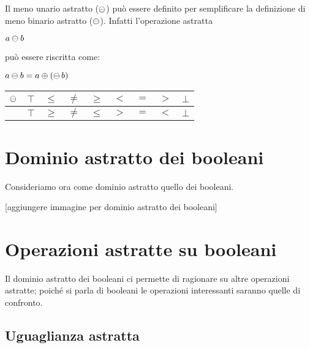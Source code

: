 Il meno unario astratto ($\mathop{\ominus}\nolimits$) può essere definito per semplificare la definizione di meno binario astratto ($\mathbin{\ominus}$). Infatti l'operazione astratta
\begin{center}
	$ a \mathbin{\ominus} b $
\end{center}
può essere riscritta come:

\begin{center}
	$ a  \mathbin{\ominus} b = a \mathbin{\oplus} (\mathop{\ominus}\nolimits b) $
\end{center}

\begin{center}
	\begin{tabular}{| c | c | c | c | c | c | c | c | c | }
		\hline
		$\mathop{\ominus}\nolimits$ & $\top$ & $\leq$ & $\neq$ & $\geq$ & $<$ & $=$ & $>$ & $\bot$ \\
		\hline
		  & $\top$ & $\geq$ & $\neq$ & $\leq$ & $>$ & $=$ & $<$ & $\bot$\\
		\hline
	\end{tabular}
\end{center}

\section{Dominio astratto dei booleani}


\newcommand*{\AbBool}{\mathrm{AbBool}}

\newcommand*{\signone}{\mathord{1}}
\newcommand*{\signzero}{\mathord{0}}

Consideriamo ora come dominio astratto quello dei booleani.

[aggiungere immagine per dominio astratto dei booleani]

\section{Operazioni astratte su booleani}

Il dominio astratto dei booleani ci permette di ragionare su altre operazioni astratte; poiché si parla di booleani le operazioni interessanti saranno quelle di confronto. 

\subsection{Uguaglianza astratta}

